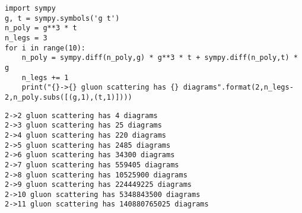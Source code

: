 \documentclass[11pt]{article}
\begin{document}
\begin{verbatim}
import sympy
g, t = sympy.symbols('g t')
n_poly = g**3 * t
n_legs = 3
for i in range(10):
    n_poly = sympy.diff(n_poly,g) * g**3 * t + sympy.diff(n_poly,t) * g
    n_legs += 1
    print("{}->{} gluon scattering has {} diagrams".format(2,n_legs-2,n_poly.subs([(g,1),(t,1)])))
\end{verbatim}

\begin{verbatim}
2->2 gluon scattering has 4 diagrams
2->3 gluon scattering has 25 diagrams
2->4 gluon scattering has 220 diagrams
2->5 gluon scattering has 2485 diagrams
2->6 gluon scattering has 34300 diagrams
2->7 gluon scattering has 559405 diagrams
2->8 gluon scattering has 10525900 diagrams
2->9 gluon scattering has 224449225 diagrams
2->10 gluon scattering has 5348843500 diagrams
2->11 gluon scattering has 140880765025 diagrams
\end{verbatim}
\end{document}
